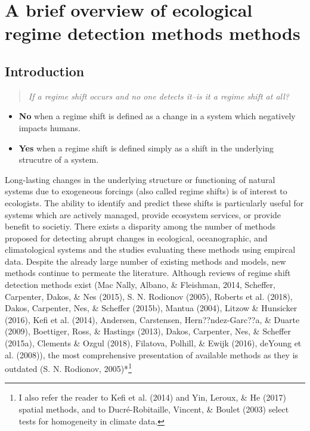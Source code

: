 \documentclass[12pt,twoside,openany]{reedthesis}
\providecommand{\tightlist}{%
  \setlength{\itemsep}{0pt}\setlength{\parskip}{0pt}}
\begin{document}
\chapter{A brief overview of ecological regime detection methods
methods}\label{rdmReview}

\section{Introduction}\label{introduction}
\begin{quote}
\emph{If a regime shift occurs and no one detects it--is it a regime
shift at all?}
\end{quote}
\begin{itemize}
\tightlist
\item
  \textbf{No} when a regime shift is defined as a change in a system
  which negatively impacts humans.
\item
  \textbf{Yes} when a regime shift is defined simply as a shift in the
  underlying strucutre of a system.
\end{itemize}
Long-lasting changes in the underlying structure or functioning of
natural systems due to exogeneous forcings (also called regime shifts)
is of interest to ecologists. The ability to identify and predict these
shifts is particularly useful for systems which are actively managed,
provide ecosystem services, or provide benefit to societiy. There exists
a disparity among the number of methods proposed for detecting abrupt
changes in ecological, oceanographic, and climatological systems and the
studies evaluating these methods using empircal data. Despite the
already large number of existing methods and models, new methods
continue to permeate the literature. Although reviews of regime shift
detection methods exist (Mac Nally, Albano, \& Fleishman, 2014,
Scheffer, Carpenter, Dakos, \& Nes (2015), S. N. Rodionov (2005),
Roberts et al. (2018), Dakos, Carpenter, Nes, \& Scheffer (2015b),
Mantua (2004), Litzow \& Hunsicker (2016), Kefi et al. (2014), Andersen,
Carstensen, Hern??ndez-Garc??a, \& Duarte (2009), Boettiger, Ross, \&
Hastings (2013), Dakos, Carpenter, Nes, \& Scheffer (2015a), Clements \&
Ozgul (2018), Filatova, Polhill, \& Ewijk (2016), deYoung et al.
(2008)), the most comprehensive presentation of available methods as
they is outdated (S. N. Rodionov, 2005)*\footnote{I also refer the
  reader to Kefi et al. (2014) and Yin, Leroux, \& He (2017) spatial
  methods, and to Ducré-Robitaille, Vincent, \& Boulet (2003) select
  tests for homogeneity in climate data.}
\end{document}
